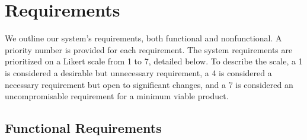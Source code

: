 
\section{Requirements}
\label{sec:requirements}
We outline our system's requirements, both functional and nonfunctional. A priority number is provided for each requirement. The system requirements are prioritized on a Likert scale from 1 to 7, detailed below. To describe the scale, a 1 is considered a desirable but unnecessary requirement, a 4 is considered a necessary requirement but open to significant changes, and a 7 is considered an uncompromisable requirement for a minimum viable product.


\subsection{Functional Requirements}
\label{sec:functional_requirements}


